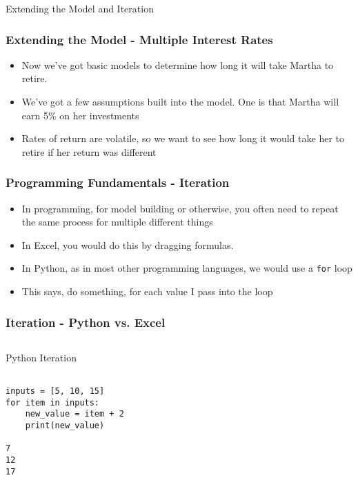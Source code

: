 \documentclass[handout, 11pt]{beamer}
\begin{document}
\begin{section}{Extending the Model and Iteration}
\begin{frame}
\frametitle{Extending the Model - Multiple Interest Rates}
\begin{itemize}
\item Now we've got basic models to determine how long it will take Martha to retire.
\vfill
\item We've got a few assumptions built into the model. One is that Martha will earn 5\% on her investments
\vfill
\item Rates of return are volatile, so we want to see how long it would take her to retire if her return was different
\end{itemize}
\end{frame}
\begin{frame}
\frametitle{Programming Fundamentals - Iteration}
\begin{itemize}
\item In programming, for model building or otherwise, you often need to repeat the same process for multiple different things
\vfill
\item In Excel, you would do this by dragging formulas.
\vfill
\item In Python, as in most other programming languages, we would use a \texttt{for} loop
\vfill
\item This says, do something, for each value I pass into the loop
\end{itemize}
\end{frame}
\begin{frame}[fragile]
\frametitle{Iteration - Python vs. Excel}
\begin{columns}
\begin{column}{0.45\textwidth}
\begin{block}{Python Iteration}
\begin{verbatim}

inputs = [5, 10, 15]
for item in inputs:
    new_value = item + 2
    print(new_value)

7
12
17
        

\end{verbatim}
\end{block}
\end{column}
\end{columns}
\end{frame}
\end{section}
\end{document}

